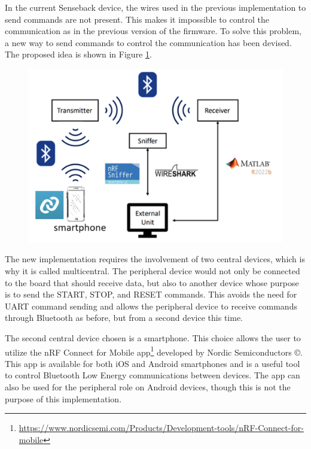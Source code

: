 \documentclass{Configuration_Files/PoliMi3i_thesis}
\begin{document}
In the current Senseback device, the wires used in the previous implementation to send commands are not present. This makes it impossible to control the communication as in the previous version of the firmware. To solve this problem, a new way to send commands to control the communication has been devised. The proposed idea is shown in Figure \ref{fig:multicentral_implementation}.


\begin{figure}[H]
    \centering
    \includegraphics[scale=0.3]{Multicentral/2.png}
    \label{fig:multicentral_implementation}
\end{figure}

The new implementation requires the involvement of two central devices, which is why it is called multicentral. The peripheral device would not only be connected to the board that should receive data, but also to another device whose purpose is to send the START, STOP, and RESET commands. This avoids the need for UART command sending and allows the peripheral device to receive commands through Bluetooth as before, but from a second device this time.

The second central device chosen is a smartphone. This choice allows the user to utilize the nRF Connect for Mobile app\footnote{\url{https://www.nordicsemi.com/Products/Development-tools/nRF-Connect-for-mobile}} developed by Nordic Semiconductors ©. This app is available for both iOS and Android smartphones and is a useful tool to control Bluetooth Low Energy communications between devices. The app can also be used for the peripheral role on Android devices, though this is not the purpose of this implementation.
\end{document}
